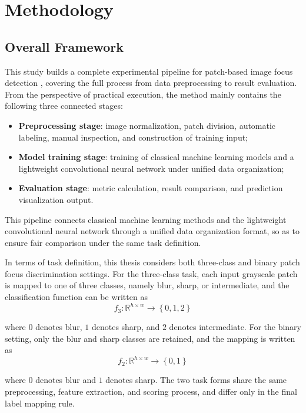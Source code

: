 \section{Methodology}
\subsection{Overall Framework}
\par This study builds a complete experimental pipeline for patch-based image
focus detection \cite{Hou_2016_CVPR}, covering the full process from data
preprocessing to result evaluation. From the perspective of practical execution,
the method mainly contains the following three connected stages:
\begin{itemize}
    \item \textbf{Preprocessing stage}: image normalization, patch division,
    automatic labeling, manual inspection, and construction of training input;
    \item \textbf{Model training stage}: training of classical machine learning
    models and a lightweight convolutional neural network under unified data
    organization;
    \item \textbf{Evaluation stage}: metric calculation, result comparison, and
    prediction visualization output.
\end{itemize}
\par This pipeline connects classical machine learning methods and the
lightweight convolutional neural network through a unified data organization
format, so as to ensure fair comparison under the same task definition.

\par In terms of task definition, this thesis considers both three-class and
binary patch focus discrimination settings. For the three-class task, each input
grayscale patch is mapped to one of three classes, namely blur, sharp, or
intermediate, and the classification function can be written as
\begin{equation}
    f_3: \mathbb{R}^{h\times w} \to \left\{ 0,1,2 \right\}
    \label{eq:3-Classification}
\end{equation}
\par where $0$ denotes blur, $1$ denotes sharp, and $2$ denotes intermediate.
For the binary setting, only the blur and sharp classes are retained, and the
mapping is written as
\begin{equation}
    f_2: \mathbb{R}^{h\times w} \to \left\{ 0,1 \right\}
    \label{eq:2-Classification}
\end{equation}
\par where $0$ denotes blur and $1$ denotes sharp. The two task forms share the
same preprocessing, feature extraction, and scoring process, and differ only in
the final label mapping rule.

